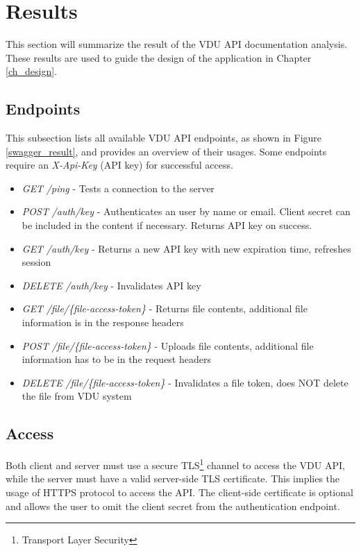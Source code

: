 \section{Results}
\label{analysis_results}
This section will summarize the result of the VDU API documentation analysis. These results are used to guide the design of the application in Chapter \ref{ch_design}.

\subsection{Endpoints}
This subsection lists all available VDU API endpoints, as shown in Figure \ref{swagger_result}, and provides an overview of their usages. Some endpoints require an \textit{X-Api-Key} (API key) for successful access.

\begin{itemize}
    \item \textit{GET} \textit{/ping} - Tests a connection to the server
    \item \textit{POST} \textit{/auth/key} - Authenticates an user by name or email. Client secret can be included in the content if necessary. Returns API key on success.
    \item \textit{GET} \textit{/auth/key} - Returns a new API key with new expiration time, refreshes session
    \item \textit{DELETE} \textit{/auth/key} - Invalidates API key
    \item \textit{GET} \textit{/file/\{file-access-token\}} - Returns file contents, additional file information is in the response headers
    \item \textit{POST} \textit{/file/\{file-access-token\}} - Uploads file contents, additional file information has to be in the request headers
    \item \textit{DELETE} \textit{/file/\{file-access-token\}} - Invalidates a file token, does NOT delete the file from VDU system
\end{itemize}

\subsection{Access}
Both client and server must use a secure TLS\footnote{Transport Layer Security} channel to access the VDU API, while the server must have a valid server-side TLS certificate. This implies the usage of HTTPS protocol to access the API. The client-side certificate is optional and allows the user to omit the client secret from the authentication endpoint.

